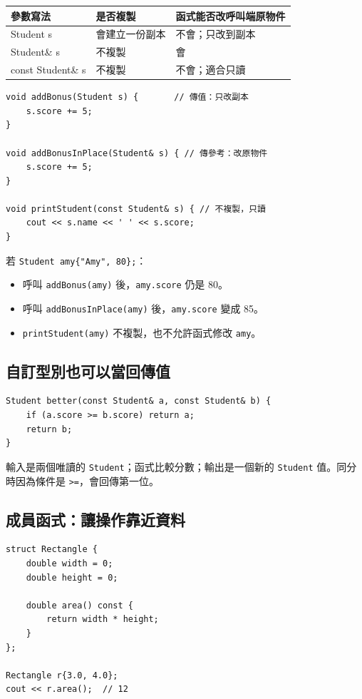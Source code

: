 \documentclass[11pt,a4paper]{article}
\newcommand{\code}[1]{\texttt{#1}}
\begin{document}
\begin{longtable}{>{\ttfamily}p{45mm}p{42mm}p{58mm}}
\toprule
參數寫法 & 是否複製 & 函式能否改呼叫端原物件 \\
\midrule
\endhead
Student s & 會建立一份副本 & 不會；只改到副本 \\
Student\& s & 不複製 & 會 \\
const Student\& s & 不複製 & 不會；適合只讀 \\
\bottomrule
\end{longtable}

\begin{lstlisting}
void addBonus(Student s) {       // 傳值：只改副本
    s.score += 5;
}

void addBonusInPlace(Student& s) { // 傳參考：改原物件
    s.score += 5;
}

void printStudent(const Student& s) { // 不複製，只讀
    cout << s.name << ' ' << s.score;
}
\end{lstlisting}

若 \code{Student amy\{"Amy", 80\};}：
\begin{itemize}
  \item 呼叫 \code{addBonus(amy)} 後，\code{amy.score} 仍是 80。
  \item 呼叫 \code{addBonusInPlace(amy)} 後，\code{amy.score} 變成 85。
  \item \code{printStudent(amy)} 不複製，也不允許函式修改 \code{amy}。
\end{itemize}

\subsection{自訂型別也可以當回傳值}

\begin{lstlisting}
Student better(const Student& a, const Student& b) {
    if (a.score >= b.score) return a;
    return b;
}
\end{lstlisting}

輸入是兩個唯讀的 \code{Student}；函式比較分數；輸出是一個新的 \code{Student} 值。同分時因為條件是 \code{>=}，會回傳第一位。

\subsection{成員函式：讓操作靠近資料}

\begin{lstlisting}
struct Rectangle {
    double width = 0;
    double height = 0;

    double area() const {
        return width * height;
    }
};

Rectangle r{3.0, 4.0};
cout << r.area();  // 12
\end{lstlisting}
\end{document}
